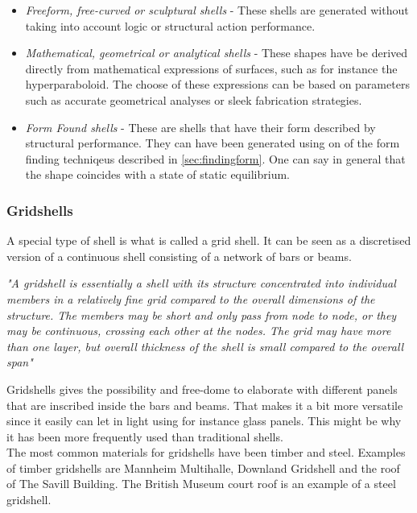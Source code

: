\begin{itemize}
\item \textit{Freeform, free-curved or sculptural shells} - These shells are generated without taking into account logic or structural action performance.   
\item \textit{Mathematical, geometrical or analytical shells} - These shapes have be derived directly from mathematical expressions of surfaces, such as for instance the hyperparaboloid. The choose of these  expressions can be based on parameters such as accurate geometrical analyses or sleek fabrication strategies. 
\item \textit{Form Found shells} - These are shells that have their form described by structural performance. They can have been generated using on of the form finding techniqeus described in \ref{sec:findingform}. One can say in general that the shape coincides with a state of static equilibrium.

\end{itemize}



\subsubsection{Gridshells}

A special type of shell is what is called a grid shell. It can be seen as a discretised version of a continuous shell consisting of a network of bars or beams.

\textit{"A gridshell is essentially a  shell with its structure concentrated into individual members in a relatively fine grid compared to the overall dimensions of the structure. The members may be short and only pass from node to node, or they may be continuous, crossing each other at the nodes. The grid may have more than one layer, but overall thickness of the shell is small compared to the overall span"} \cite{ref:ShellOpt}

Gridshells gives the possibility and free-dome to elaborate with different panels that are inscribed inside the bars and beams. That makes it a bit more versatile since it easily can let in light using for instance glass panels. This might be why it has been more frequently used than traditional shells. \\
The most common materials for gridshells have been timber and steel. Examples of timber gridshells are Mannheim Multihalle, Downland Gridshell and the roof of The Savill Building. The British Museum court roof is an example of a steel gridshell.

